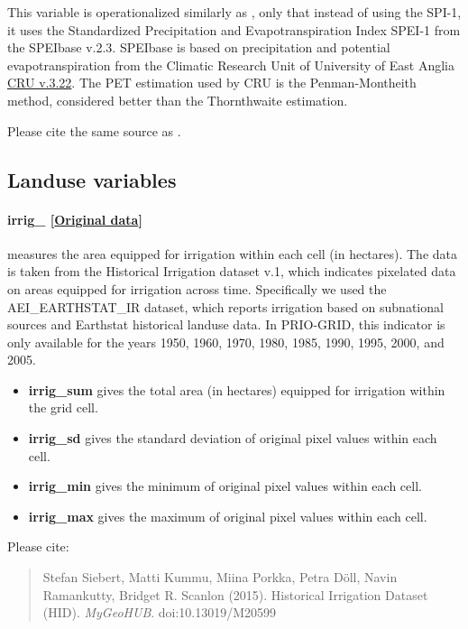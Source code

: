 \documentclass[]{book}
\begin{document}
This variable is operationalized similarly as ,
only that instead of using the SPI-1, it uses the Standardized
Precipitation and Evapotranspiration Index SPEI-1 from the SPEIbase
v.2.3. SPEIbase is based on precipitation and potential
evapotranspiration from the Climatic Research Unit of University of East
Anglia \href{http://browse.ceda.ac.uk/browse/badc/cru/data}{CRU v.3.22}.
The PET estimation used by CRU is the Penman-Montheith method,
considered better than the Thornthwaite estimation.

Please cite the same source as .

\subsection{Landuse variables}\label{landuse-variables-1}

\paragraph{irrig\_
{[}\href{https://mygeohub.org/publications/8}{Original
data}{]}}\label{irrig-}

measures the area equipped for irrigation within each cell (in
hectares). The data is taken from the Historical Irrigation dataset v.1,
which indicates pixelated data on areas equipped for irrigation across
time. Specifically we used the AEI\_EARTHSTAT\_IR dataset, which reports
irrigation based on subnational sources and Earthstat historical landuse
data. In PRIO-GRID, this indicator is only available for the years 1950,
1960, 1970, 1980, 1985, 1990, 1995, 2000, and 2005.

\begin{itemize}
\itemsep1pt\parskip0pt
\item
  \textbf{irrig\_sum} gives the total area (in hectares) equipped for
  irrigation within the grid cell.
\item
  \textbf{irrig\_sd} gives the standard deviation of original pixel
  values within each cell.
\item
  \textbf{irrig\_min} gives the minimum of original pixel values within
  each cell.
\item
  \textbf{irrig\_max} gives the maximum of original pixel values within
  each cell.
\end{itemize}

Please cite:

\begin{quote}
Stefan Siebert, Matti Kummu, Miina Porkka, Petra Döll, Navin Ramankutty,
Bridget R. Scanlon (2015). Historical Irrigation Dataset (HID).
\emph{MyGeoHUB}. doi:10.13019/M20599
\end{quote}
\end{document}

